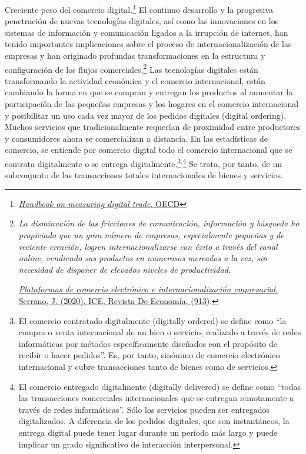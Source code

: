 \documentclass[10pt,a4paper]{article}
\begin{document}
Creciente peso del comercio digital.\footnote{%
    \href{https://www.oecd-ilibrary.org/trade/handbook-on-measuring-digitaltrade-second-edition_ac99e6d3-en}{\textit{Handbook on measuring digital trade}. OECD}
} El continuo desarrollo y la progresiva penetración de nuevas tecnologías digitales, así como las innovaciones en los sistemas de información y comunicación ligados a la irrupción de internet, han tenido importantes implicaciones sobre el proceso de internacionalización de las empresas y han originado profundas transformaciones en la estructura y configuración de los flujos comerciales.\footnote{%
    \textit{La disminución de las fricciones de comunicación, información y búsqueda ha propiciado que un gran número de empresas, especialmente pequeñas y de reciente creación, logren internacionalizarse con éxito a través del canal online, vendiendo sus productos en numerosos mercados a la vez, sin necesidad de disponer de elevados niveles de productividad}. 

\href{https://doi.org/10.32796/ice.2020.913.6987}{\textit{Plataformas de comercio electrónico e internacionalización empresarial}. Serrano, J. (2020). ICE, Revista De Economía, (913)}.
} Las tecnologías digitales están transformando la actividad económica y el comercio internacional, están cambiando la forma en que se compran y entregan los productos al aumentar la participación de las pequeñas empresas y los hogares en el comercio internacional y posibilitar un uso cada vez mayor de los pedidos digitales (digital ordering). Muchos servicios que tradicionalmente requerían de proximidad entre productores y consumidores ahora se comercializan a distancia. En las estadísticas de comercio, se entiende por comercio digital todo el comercio internacional que se contrata digitalmente o se entrega digitalmente.\footnote{%
    El comercio contratado digitalmente (digitally ordered) se define como “la compra o venta internacional de un bien o servicio, realizado a través de redes informáticas por métodos específicamente diseñados con el propósito de recibir o hacer pedidos”. Es, por tanto, sinónimo de comercio electrónico internacional y cubre transacciones tanto de bienes como de servicios.
}\textsuperscript{,}\footnote{%
    El comercio entregado digitalmente (digitally delivered) se define como “todas las transacciones comerciales internacionales que se entregan remotamente a través de redes informáticas”. Sólo los servicios pueden ser entregados digitalizados. A diferencia de los pedidos digitales, que son instantáneos, la entrega digital puede tener lugar durante un período más largo y puede implicar un grado significativo de interacción interpersonal.
} Se trata, por tanto, de un subconjunto de las transacciones totales internacionales de bienes y servicios. 
\end{document}
